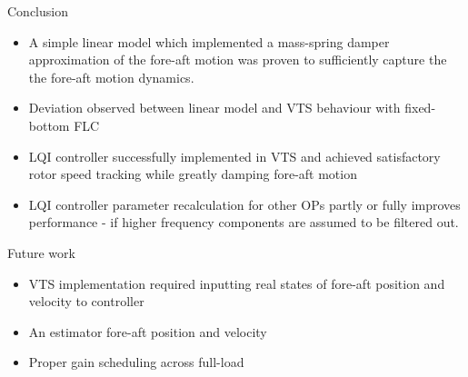 \begin{frame}{Conclusion}{}
	\begin{itemize}
		\item A simple linear model which implemented a mass-spring damper approximation of the fore-aft motion was proven to sufficiently capture the the fore-aft motion dynamics.
		\item Deviation observed between linear model and VTS behaviour with fixed-bottom FLC
		\item LQI controller successfully implemented in VTS and achieved satisfactory rotor speed tracking while greatly damping fore-aft motion
		\item LQI controller parameter recalculation for other OPs partly or fully improves performance - if higher frequency components are assumed to be filtered out.
	\end{itemize}
\end{frame}

\begin{frame}{Future work}{}
	
	\begin{itemize}
		\item VTS implementation required inputting real states of fore-aft position and velocity to controller
		\item An estimator fore-aft position and velocity
		\item Proper gain scheduling across full-load
	\end{itemize}

\end{frame}
